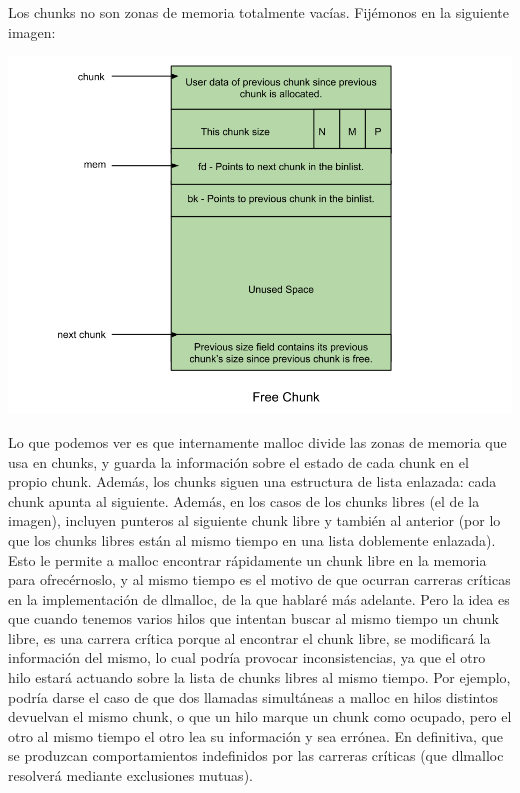 \documentclass[a4paper]{article}
\begin{document}
Los chunks no son zonas de memoria totalmente vacías. Fijémonos en la siguiente imagen:
\begin{center}
\includegraphics[scale=0.35]{Free_chunk.png}
\end{center}

Lo que podemos ver es que internamente {\ttfamily malloc} divide las zonas de memoria que usa en chunks, y guarda la información sobre el estado de cada chunk en el propio chunk. Además, los chunks siguen una estructura de lista enlazada: cada chunk apunta al siguiente. Además, en los casos de los chunks libres (el de la imagen), incluyen punteros al siguiente chunk libre y también al anterior (por lo que los chunks libres están al mismo tiempo en una lista doblemente enlazada). Esto le permite a {\ttfamily malloc} encontrar rápidamente un chunk libre en la memoria para ofrecérnoslo, y al mismo tiempo es el motivo de que ocurran carreras críticas en la implementación de {\ttfamily dlmalloc}, de la que hablaré más adelante. Pero la idea es que cuando tenemos varios hilos que intentan buscar al mismo tiempo un chunk libre, es una carrera crítica porque al encontrar el chunk libre, se modificará la información del mismo, lo cual podría provocar inconsistencias, ya que el otro hilo estará actuando sobre la lista de chunks libres al mismo tiempo. Por ejemplo, podría darse el caso de que dos llamadas simultáneas a {\ttfamily malloc} en hilos distintos devuelvan el mismo chunk, o que un hilo marque un chunk como ocupado, pero el otro al mismo tiempo el otro lea su información y sea errónea. En definitiva, que se produzcan comportamientos indefinidos por las carreras críticas (que {\ttfamily dlmalloc} resolverá mediante exclusiones mutuas).
\end{document}
